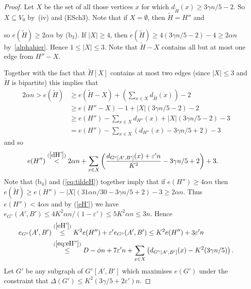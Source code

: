 \documentclass{memo-l}
\def\COMMENT#1{}
\def\eps{\varepsilon}
\numberwithin{section}{chapter}
\numberwithin{equation}{section}
\numberwithin{firstthm}{section}
\numberwithin{figure}{section}
\begin{document}
{\begin{proof}
Let $X$ be the set of all those vertices $x$ for which $d_{\widetilde{H}}(x) \geq  3 \gamma n/ 5 -2$. So $X\subseteq V_0$ by~(iv) and (ESch3).
Note that if $X = \emptyset$, then  $\widetilde{H} = H''$ and%
   \COMMENT{If $\widetilde{H} \neq H''$ then $e(H'')-e(\widetilde{H}) \ge 2$ (as it is even). But the maximality of $\widetilde{H}$ implies that
 adding any two edges in $H''-\widetilde{H}$ to $\widetilde{H}$ would create a vertex
of degree $>3 \gamma n/ 5$.}
so $e(\widetilde{H}) \ge  2 \alpha n$ by (b$_3$). If $|X| \ge 4$, then $e(\widetilde{H}) \ge 4 (  3 \gamma n/ 5  -2)  -4\ge 2\alpha n $
by~\eqref{alphahier}. Hence $1\le |X| \le 3$. Note that $\widetilde{H}-X$ contains all but at most one edge from $H''-X$.%
   \COMMENT{Might have deleted one edge in $H''-X$ in order to ensure that $e(\widetilde{H})$ is even.}
Together with the fact that $\widetilde{H}[X]$ contains at most two edges (since $|X|\le 3$ and $\widetilde{H}$ is bipartite) this implies
that
\begin{align}\label{eq:tildeH}
2\alpha n  > e(\widetilde{H}) & \ge e(\widetilde{H}-X)+ \left( \sum_{x \in X} d_{\widetilde{H}}(x) \right) -2 \nonumber \\
& \ge e(H''-X)-1 +|X|(3 \gamma n/ 5  -2)-2\nonumber \\
& \ge e(H'')-\sum_{x \in X} d_{H''}(x)+|X|(3 \gamma n/ 5  -2)-3\nonumber \\
& =e(H'')-\sum_{x \in X} (d_{H''}(x)-3 \gamma n/ 5  +2)-3
\end{align}
and so
\begin{align}\label{eq:eH''}
e(H'')& \overset{(\ref{dH'})}{< } 2 \alpha n + \sum_{x \in X} \left( \frac{d_{G^{\diamond}[A',B']}(x)+\eps' n}{K^2} - 3 \gamma n /5 +2 \right) +3.
\end{align}
Note that (b$_4$) and (\ref{eq:tildeH}) together imply that if $e(H'')\ge 4\alpha n$ then
$e(\widetilde{H})\ge e(H'')-|X|(31\alpha n/30- 3 \gamma n/ 5  +2)-3\ge 2\alpha n$. Thus $e(H'')< 4\alpha n$ and by (\ref{eH'})
we have $e_{G^{\diamond}}(A',B')\le 4K^2\alpha n/(1-\eps')\le 5K^2\alpha n\le 3n$. Hence
\begin{align}\label{alpha3}
	e_{G^{\diamond}}(A',B') & \stackrel{(\ref{eH'})}{\le}  K^2 e(H'')+\eps' e_{G^{\diamond}}(A',B')\le K^2 e(H'')+3\eps'n\nonumber \\
& \stackrel{(\ref{eq:eH''})}{\le}
  D- \phi n + 7 \eps' n + \sum_{x \in X } \left( d_{G^{\diamond}[A',B']}(x) -  K^2(3\gamma n/5) \right).
\end{align}
Let $G'$ be any subgraph of $G^{\diamond}[A',B']$ which maximises $e(G')$ under the constraint that $\Delta(G') \le K^2(3 \gamma / 5 +2\eps' ) n$.

\end{proof}}
\end{document}
